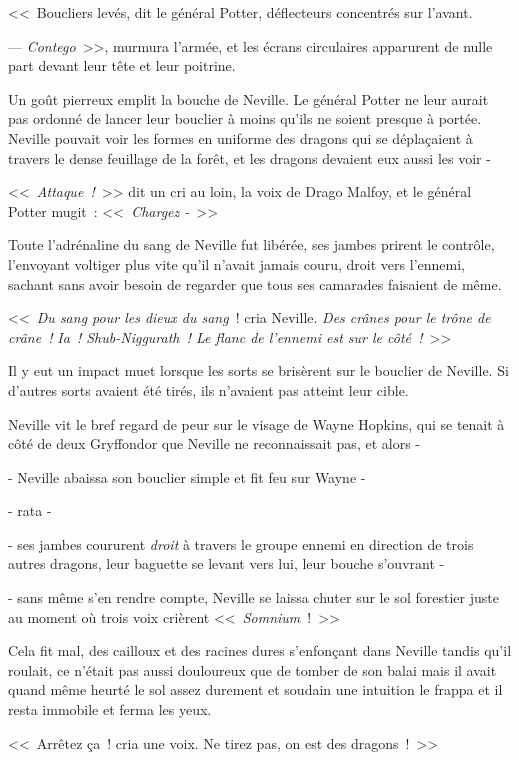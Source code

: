 <<~Boucliers levés, dit le général Potter, déflecteurs concentrés sur l'avant.

--- \emph{Contego}~>>, murmura l'armée, et les écrans circulaires apparurent de nulle part devant leur tête et leur poitrine.

Un goût pierreux emplit la bouche de Neville. Le général Potter ne leur aurait pas ordonné de lancer leur bouclier à moins qu'ils ne soient presque à portée. Neville pouvait voir les formes en uniforme des dragons qui se déplaçaient à travers le dense feuillage de la forêt, et les dragons devaient eux aussi les voir -

<<~\emph{Attaque~!}~>> dit un cri au loin, la voix de Drago Malfoy, et le général Potter mugit~: <<~\emph{Chargez -}~>>

Toute l'adrénaline du sang de Neville fut libérée, ses jambes prirent le contrôle, l'envoyant voltiger plus vite qu'il n'avait jamais couru, droit vers l'ennemi, sachant sans avoir besoin de regarder que tous ses camarades faisaient de même.

<<~\emph{Du sang pour les dieux du sang}~! cria Neville. \emph{Des crânes pour le trône de crâne~!} \emph{Ia~! Shub-Niggurath~! Le flanc de l'ennemi est sur le côté~!}~>>

Il y eut un impact muet lorsque les sorts se brisèrent sur le bouclier de Neville. Si d'autres sorts avaient été tirés, ils n'avaient pas atteint leur cible.

Neville vit le bref regard de peur sur le visage de Wayne Hopkins, qui se tenait à côté de deux Gryffondor que Neville ne reconnaissait pas, et alors -

- Neville abaissa son bouclier simple et fit feu sur Wayne -

- rata -

- ses jambes coururent \emph{droit} à travers le groupe ennemi en direction de trois autres dragons, leur baguette se levant vers lui, leur bouche s'ouvrant -

- sans même s'en rendre compte, Neville se laissa chuter sur le sol forestier juste au moment où trois voix crièrent <<~\emph{Somnium}~!~>>

Cela fit mal, des cailloux et des racines dures s'enfonçant dans Neville tandis qu'il roulait, ce n'était pas aussi douloureux que de tomber de son balai mais il avait quand même heurté le sol assez durement et soudain une intuition le frappa et il resta immobile et ferma les yeux.

<<~Arrêtez ça~! cria une voix. Ne tirez pas, on est des dragons~!~>>

